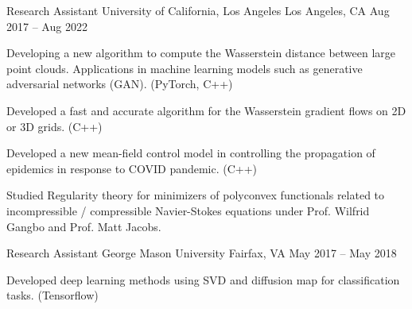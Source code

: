 

\begin{cventries}

  \cventry
    {Research Assistant} %
    {University of California, Los Angeles} %
    {Los Angeles, CA} %
    {Aug 2017 – Aug 2022} %
    {
      \begin{cvitems} %
        \item Developing a new algorithm to compute the Wasserstein distance between large point clouds. Applications in machine learning models such as generative adversarial networks (GAN). {\footnotesize (PyTorch, C++)}
          \item Developed a fast and accurate algorithm for the Wasserstein gradient flows on 2D or 3D grids. {\footnotesize (C++)}
          \item Developed a new mean-field control model in controlling the propagation of epidemics in response to COVID pandemic. {\footnotesize (C++)}
          \item Studied Regularity theory for minimizers of polyconvex functionals related to incompressible / compressible Navier-Stokes equations under Prof. Wilfrid Gangbo and Prof. Matt Jacobs.
      \end{cvitems}
    }

  \cventry
    {Research Assistant} %
    {George Mason University} %
    {Fairfax, VA} %
    {May 2017 – May 2018} %
    {
      \begin{cvitems} %
        \item Developed deep learning methods using SVD and diffusion map for classification tasks. {\footnotesize (Tensorflow)}
      \end{cvitems}
    }


\end{cventries}
